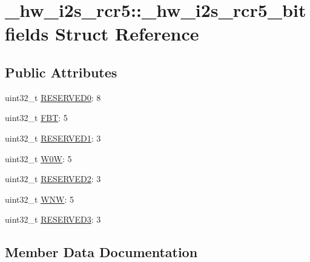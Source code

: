 \hypertarget{struct__hw__i2s__rcr5_1_1__hw__i2s__rcr5__bitfields}{}\section{\+\_\+hw\+\_\+i2s\+\_\+rcr5\+:\+:\+\_\+hw\+\_\+i2s\+\_\+rcr5\+\_\+bitfields Struct Reference}
\label{struct__hw__i2s__rcr5_1_1__hw__i2s__rcr5__bitfields}
\subsection*{Public Attributes}
\begin{DoxyCompactItemize}
\item 
uint32\+\_\+t \hyperlink{struct__hw__i2s__rcr5_1_1__hw__i2s__rcr5__bitfields_ae725b2f2baf5c9309bf88519e0c9e8d2}{R\+E\+S\+E\+R\+V\+E\+D0}\+: 8
\item 
uint32\+\_\+t \hyperlink{struct__hw__i2s__rcr5_1_1__hw__i2s__rcr5__bitfields_ad4b1e2d4f62b15e712718a5829d6ac50}{F\+BT}\+: 5
\item 
uint32\+\_\+t \hyperlink{struct__hw__i2s__rcr5_1_1__hw__i2s__rcr5__bitfields_ad1eee6394750ec3d7753dfda6e9f9a9a}{R\+E\+S\+E\+R\+V\+E\+D1}\+: 3
\item 
uint32\+\_\+t \hyperlink{struct__hw__i2s__rcr5_1_1__hw__i2s__rcr5__bitfields_a92f83d0fd41d13242a743d9e4924ae99}{W0W}\+: 5
\item 
uint32\+\_\+t \hyperlink{struct__hw__i2s__rcr5_1_1__hw__i2s__rcr5__bitfields_a3d2745d13b50e11bb0e5fb47d595de74}{R\+E\+S\+E\+R\+V\+E\+D2}\+: 3
\item 
uint32\+\_\+t \hyperlink{struct__hw__i2s__rcr5_1_1__hw__i2s__rcr5__bitfields_a331661a0e269b929688707be712da072}{W\+NW}\+: 5
\item 
uint32\+\_\+t \hyperlink{struct__hw__i2s__rcr5_1_1__hw__i2s__rcr5__bitfields_a775d9fe651b55bf6851e422db32865ad}{R\+E\+S\+E\+R\+V\+E\+D3}\+: 3
\end{DoxyCompactItemize}


\subsection{Member Data Documentation}
